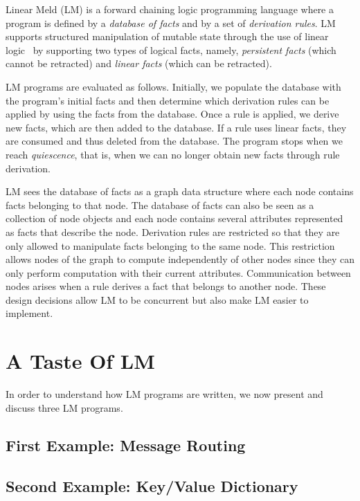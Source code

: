 
Linear Meld (LM) is a forward chaining logic programming language where a
program is defined by a \emph{database of facts} and by a set of
\emph{derivation rules}. LM supports structured manipulation of mutable state
through the use of linear logic~\cite{girard-87} by supporting two types of
logical facts, namely, \emph{persistent facts} (which cannot be retracted) and
\emph{linear facts} (which can be retracted).

LM programs are evaluated as follows. Initially, we populate the database with
the program's initial facts and then determine which derivation rules can be
applied by using the facts from the database. Once a rule is applied, we derive
new facts, which are then added to the database. If a rule uses linear facts,
they are consumed and thus deleted from the database. The program stops when we
reach \emph{quiescence}, that is, when we can no longer obtain new facts through
rule derivation.

LM sees the database of facts as a graph data structure where each node contains
facts belonging to that node. The database of facts can also be seen as a
collection of node objects and each node contains several attributes represented
as facts that describe the node. Derivation rules are restricted so that they
are only allowed to manipulate facts belonging to the same node. This
restriction allows nodes of the graph to compute independently of other nodes
since they can only perform computation with their current attributes.
Communication between nodes arises when a rule derives a fact that belongs to
another node. These design decisions allow LM to be concurrent but also make LM
easier to implement.

\section{A Taste Of LM}

In order to understand how LM programs are written, we now present and discuss
three LM programs.

\subsection{First Example: Message Routing}\label{section:language:message}


\subsection{Second Example: Key/Value Dictionary}\label{sec:language:key_value}


